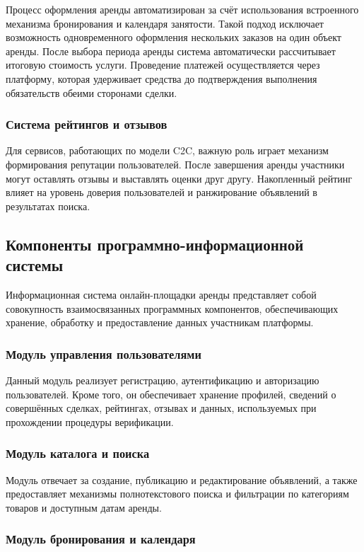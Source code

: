 Процесс оформления аренды автоматизирован за счёт использования встроенного механизма бронирования и календаря занятости. Такой подход исключает возможность одновременного оформления нескольких заказов на один объект аренды. После выбора периода аренды система автоматически рассчитывает итоговую стоимость услуги. Проведение платежей осуществляется через платформу, которая удерживает средства до подтверждения выполнения обязательств обеими сторонами сделки.

\subsubsection{Система рейтингов и отзывов}

Для сервисов, работающих по модели C2C, важную роль играет механизм формирования репутации пользователей. После завершения аренды участники могут оставлять отзывы и выставлять оценки друг другу. Накопленный рейтинг влияет на уровень доверия пользователей и ранжирование объявлений в результатах поиска.

\subsection{Компоненты программно-информационной системы}

Информационная система онлайн-площадки аренды представляет собой совокупность взаимосвязанных программных компонентов, обеспечивающих хранение, обработку и предоставление данных участникам платформы.

\subsubsection{Модуль управления пользователями}

Данный модуль реализует регистрацию, аутентификацию и авторизацию пользователей. Кроме того, он обеспечивает хранение профилей, сведений о совершённых сделках, рейтингах, отзывах и данных, используемых при прохождении процедуры верификации.

\subsubsection{Модуль каталога и поиска}

Модуль отвечает за создание, публикацию и редактирование объявлений, а также предоставляет механизмы полнотекстового поиска и фильтрации по категориям товаров и доступным датам аренды.

\subsubsection{Модуль бронирования и календаря}


